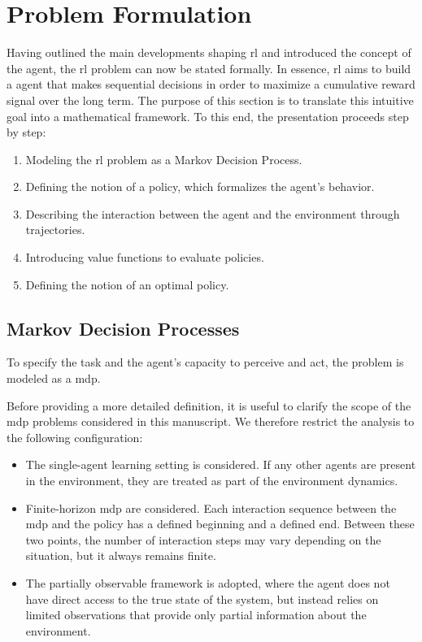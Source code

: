\section{Problem Formulation}
\label{sec:rl_problem_formulation}

Having outlined the main developments shaping \gls{rl} and introduced the concept of the agent, the \gls{rl} problem can now be stated formally.
In essence, \gls{rl} aims to build a agent that makes sequential decisions in order to maximize a cumulative reward signal over the long term.
The purpose of this section is to translate this intuitive goal into a mathematical framework.
To this end, the presentation proceeds step by step:
\begin{enumerate}
    \item Modeling the \gls{rl} problem as a Markov Decision Process.
    \item Defining the notion of a policy, which formalizes the agent's behavior.
    \item Describing the interaction between the agent and the environment through trajectories.
    \item Introducing value functions to evaluate policies.
    \item Defining the notion of an optimal policy.
\end{enumerate}

\subsection{Markov Decision Processes}
\label{subsec:markov_decision_processes}

To specify the task and the agent's capacity to perceive and act, the problem is modeled as a \gls{mdp}.

Before providing a more detailed definition, it is useful to clarify the scope of the \gls{mdp} problems considered in this manuscript.
We therefore restrict the analysis to the following configuration:

\begin{itemize}
    \item The single-agent learning setting is considered.
    If any other agents are present in the environment, they are treated as part of the environment dynamics.

    \item Finite-horizon \gls{mdp} are considered.  
    Each interaction sequence between the \gls{mdp} and the policy has a defined beginning and a defined end.  
    Between these two points, the number of interaction steps may vary depending on the situation, but it always remains finite.

    \item The partially observable framework is adopted, where the agent does not have direct access to the true state of the system, but instead relies on limited observations that provide only partial information about the environment.  
\end{itemize}


